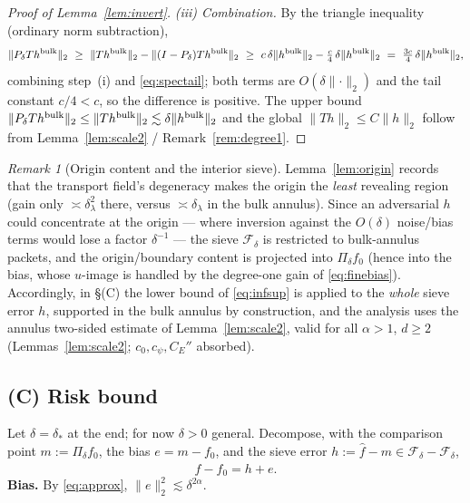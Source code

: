 \documentclass[11pt]{article}
\theoremstyle{remark}
\newtheorem{remark}[theorem]{Remark}
\newcommand{\F}{\mathcal{F}}
\newcommand{\norm}[1]{\lVert #1\rVert}
\begin{document}
\begin{proof}[Proof of Lemma~\ref{lem:invert}]
\smallskip
\noindent\emph{(iii) Combination.} By the triangle inequality (ordinary
norm subtraction),
\[
\norm{P_\delta Th^{\rm bulk}}_2
\ \ge\ \norm{Th^{\rm bulk}}_2-\norm{(I-P_\delta)Th^{\rm bulk}}_2
\ \ge\ c\,\delta\norm{h^{\rm bulk}}_2-\tfrac c4\,\delta
\norm{h^{\rm bulk}}_2
\ =\ \tfrac{3c}{4}\,\delta\norm{h^{\rm bulk}}_2 ,
\]
combining step~(i) and \eqref{eq:spectail}; both terms are
$O(\delta\norm{\cdot}_2)$ and the tail constant $c/4<c$, so the
difference is positive. The upper bound
$\norm{P_\delta Th^{\rm bulk}}_2\le\norm{Th^{\rm bulk}}_2
\lesssim\delta\norm{h^{\rm bulk}}_2$ and the global
$\norm{Th}_2\le C\norm{h}_2$ follow from Lemma~\ref{lem:scale2} /
Remark~\ref{rem:degree1}.
\end{proof}

\begin{remark}[Origin content and the interior sieve]\label{rem:modewise}
Lemma~\ref{lem:origin} records that the transport field's degeneracy makes
the origin the \emph{least} revealing region (gain only
$\asymp\delta_\lambda^{2}$ there, versus $\asymp\delta_\lambda$ in the bulk
annulus). Since an adversarial $h$ could concentrate at the origin ---
where inversion against the $O(\delta)$ noise/bias terms would lose a
factor $\delta^{-1}$ --- the sieve $\F_\delta$ is restricted to
bulk-annulus packets, and the origin/boundary content is projected into
$\Pi_\delta f_0$ (hence into the bias, whose $u$-image is handled by the
degree-one gain of \eqref{eq:finebias}). Accordingly, in \S(C) the lower
bound of \eqref{eq:infsup} is applied to the \emph{whole} sieve error $h$,
supported in the bulk annulus by construction, and the analysis uses the
annulus two-sided estimate of Lemma~\ref{lem:scale2}, valid for all
$\alpha>1$, $d\ge2$ (Lemmas~\ref{lem:scale2}; $c_0,c_\psi,C_E''$
absorbed).
\end{remark}

\subsection{(C) Risk bound}
Let $\delta=\delta_*$ at the end; for now $\delta>0$ general. Decompose,
with the comparison point $m:=\Pi_\delta f_0$, the bias $e=m-f_0$, and the
sieve error $h:=\widehat f-m\in\F_\delta-\F_\delta$,
\[
\widehat f-f_0=h+e .
\]
\textbf{Bias.} By \eqref{eq:approx}, $\norm{e}_2^{2}\lesssim\delta^{2\alpha}$.
\end{document}
